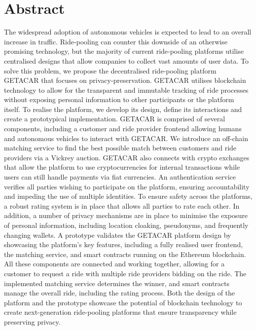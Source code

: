 \documentclass[
  a4paper,  %
  twoside,  %
  bibliography=totoc,
  headsepline,
  cleardoublepage=empty,
  parskip=half,
  draft=false
]{scrbook}
\begin{document}
  \section*{Abstract}
The widespread adoption of autonomous vehicles is expected to lead to an overall increase in traffic. Ride-pooling can counter this downside of an otherwise promising technology, but the majority of current ride-pooling platforms utilise centralised designs that allow companies to collect vast amounts of user data. To solve this problem, we propose the decentralised ride-pooling platform GETACAR that focuses on privacy-preservation. GETACAR utilises blockchain technology to allow for the transparent and immutable tracking of ride processes without exposing personal information to other participants or the platform itself. To realise the platform, we develop its design, define its interactions and create a prototypical implementation. GETACAR is comprised of several components, including a customer and ride provider frontend allowing humans and autonomous vehicles to interact with GETACAR. We introduce an off-chain matching service to find the best possible match between customers and ride providers via a Vickrey auction.  GETACAR also connects with crypto exchanges that allow the platform to use cryptocurrencies for internal transactions while users can still handle payments via fiat currencies.
An authentication service verifies all parties wishing to participate on the platform, ensuring accountability and impeding the use of multiple identities.  To ensure safety across the platforms, a robust rating system is in place that allows all parties to rate each other. In addition, a number of privacy mechanisms are in place to minimise the exposure of personal information, including location cloaking, pseudonyms, and frequently changing wallets. A prototype validates the GETACAR platform design by showcasing the platform's key features, including a fully realised user frontend, the matching service, and smart contracts running on the Ethereum blockchain. All these components are connected and working together, allowing for a customer to request a ride with multiple ride providers bidding on the ride. The implemented matching service determines the winner, and smart contracts manage the overall ride, including the rating process. Both the design of the platform and the prototype showcase the potential of blockchain technology to create next-generation ride-pooling platforms that ensure transparency while preserving privacy.

\cleardoublepage
\end{document}
